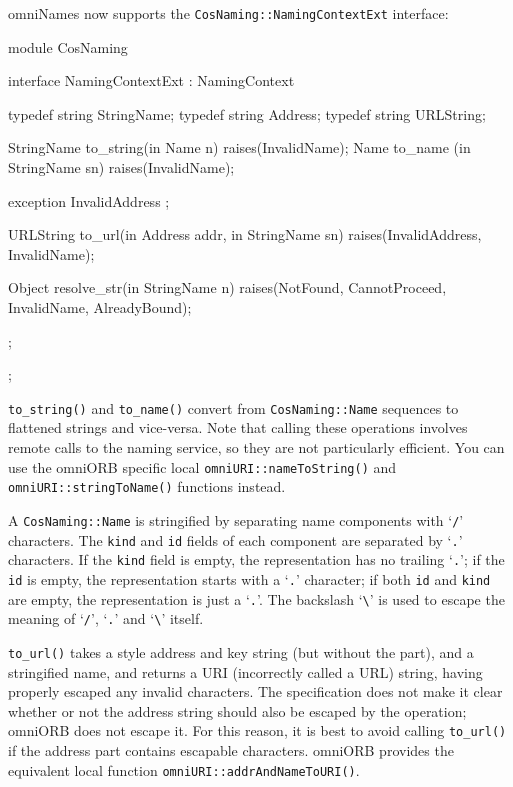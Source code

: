 \documentclass[11pt,twoside,a4paper]{book}
\newcommand{\type}[1]{\texttt{#1}}
\newcommand{\intf}[1]{\texttt{#1}}
\newcommand{\code}[1]{\texttt{#1}}
\newcommand{\op}[1]{\texttt{#1()}}
\newcommand{\corbauri}{\begingroup \urlstyle{tt}\Url}
\newcommand{\dsc}{\discretionary{}{}{}}
\begin{document}
omniNames now supports the \intf{CosNaming::NamingContextExt}
interface:

\begin{idllisting}
module CosNaming {
  interface NamingContextExt : NamingContext {
    typedef string StringName;
    typedef string Address;
    typedef string URLString;

    StringName  to_string(in Name n)        raises(InvalidName);
    Name        to_name  (in StringName sn) raises(InvalidName);

    exception InvalidAddress {};

    URLString   to_url(in Address addr, in StringName sn)
      raises(InvalidAddress, InvalidName);

    Object      resolve_str(in StringName n)
      raises(NotFound, CannotProceed, InvalidName, AlreadyBound);
  };
};
\end{idllisting}

\op{to\_string} and \op{to\_name} convert from \type{CosNaming::Name}
sequences to flattened strings and vice-versa.  Note that calling
these operations involves remote calls to the naming service, so they
are not particularly efficient. You can use the omniORB specific local
\op{omniURI::nameToString} and \op{omniURI::\dsc{}stringToName}
functions instead.

A \type{CosNaming::Name} is stringified by separating name components
with `\texttt{/}' characters. The \code{kind} and \code{id} fields of
each component are separated by `\texttt{.}' characters. If the
\code{kind} field is empty, the representation has no trailing
`\texttt{.}'; if the \code{id} is empty, the representation starts
with a `\texttt{.}' character; if both \texttt{id} and \texttt{kind}
are empty, the representation is just a `\texttt{.}'. The backslash
`\texttt{\textbackslash}' is used to escape the meaning of
`\texttt{/}', `\texttt{.}' and `\texttt{\textbackslash}' itself.

\op{to\_url} takes a \corbauri{corbaloc} style address and key string
(but without the \corbauri{corbaloc:} part), and a stringified name,
and returns a \corbauri{corbaname} URI (incorrectly called a URL)
string, having properly escaped any invalid characters. The
specification does not make it clear whether or not the address string
should also be escaped by the operation; omniORB does not escape
it. For this reason, it is best to avoid calling \op{to\_url} if the
address part contains escapable characters.  omniORB provides the
equivalent local function \op{omniURI::addrAndNameToURI}.
\end{document}

